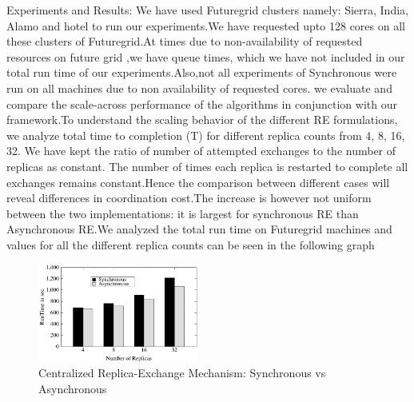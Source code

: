\documentclass[]{paper}
\begin{document}

Experiments and Results:
We have used Futuregrid clusters namely: Sierra, India, Alamo and hotel to run our experiments.We have requested upto 128 cores on all these clusters of Futuregrid.At times due to non-availability of requested resources on future grid ,we have queue times, which we have not included in our total run time of our experiments.Also,not all experiments of Synchronous were run on all machines due to non availability of requested cores. we evaluate and compare the scale-across performance of the algorithms in conjunction with our framework.To understand the scaling behavior of the different RE formulations, we analyze total time to completion (T) for different replica counts from 4, 8, 16, 32. We have kept the ratio of number of attempted exchanges to the number of replicas as constant. The number of times each replica is restarted to complete all exchanges remains constant.Hence the comparison between different cases will reveal differences in coordination cost.The increase is however not uniform between the two 
implementations: it is largest for synchronous RE than Asynchronous RE.We analyzed the total run time on Futuregrid machines and values for all the different replica counts can be seen in the following graph
\begin{figure}[t]
	\centering
\includegraphics[width=0.47\textwidth]{figures/FG_RE.pdf}
\caption{Centralized Replica-Exchange Mechanism: Synchronous vs Asynchronous} 	
\label{figure(i)}
\end{figure}		
\end{document}
